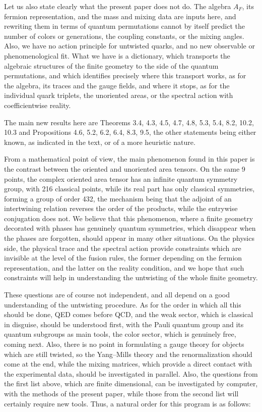 \documentclass[11pt]{amsart}
\theoremstyle{definition}
\begin{document}
Let us also state clearly what the present paper does not do. The algebra $A_F$, its fermion representation, and the mass and mixing data are inputs here, and rewriting them in terms of quantum permutations cannot by itself predict the number of colors or generations, the coupling constants, or the mixing angles. Also, we have no action principle for untwisted quarks, and no new observable or phenomenological fit. What we have is a dictionary, which transports the algebraic structures of the finite geometry to the side of the quantum permutations, and which identifies precisely where this transport works, as for the algebra, its traces and the gauge fields, and where it stops, as for the individual quark triplets, the unoriented areas, or the spectral action with coefficientwise reality.

The main new results here are Theorems 3.4, 4.3, 4.5, 4.7, 4.8, 5.3, 5.4, 8.2, 10.2, 10.3 and Propositions 4.6, 5.2, 6.2, 6.4, 8.3, 9.5, the other statements being either known, as indicated in the text, or of a more heuristic nature.

From a mathematical point of view, the main phenomenon found in this paper is the contrast between the oriented and unoriented area tensors. On the same 9 points, the complex oriented area tensor has an infinite quantum symmetry group, with 216 classical points, while its real part has only classical symmetries, forming a group of order 432, the mechanism being that the adjoint of an intertwining relation reverses the order of the products, while the entrywise conjugation does not. We believe that this phenomenon, where a finite geometry decorated with phases has genuinely quantum symmetries, which disappear when the phases are forgotten, should appear in many other situations. On the physics side, the physical trace and the spectral action provide constraints which are invisible at the level of the fusion rules, the former depending on the fermion representation, and the latter on the reality condition, and we hope that such constraints will help in understanding the untwisting of the whole finite geometry.

These questions are of course not independent, and all depend on a good understanding of the untwisting procedure. As for the order in which all this should be done, QED comes before QCD, and the weak sector, which is classical in disguise, should be understood first, with the Pauli quantum group \cite{bcp} and its quantum subgroups \cite{bbi} as main tools, the color sector, which is genuinely free, coming next. Also, there is no point in formulating a gauge theory for objects which are still twisted, so the Yang--Mills theory and the renormalization should come at the end, while the mixing matrices, which provide a direct contact with the experimental data, should be investigated in parallel. Also, the questions from the first list above, which are finite dimensional, can be investigated by computer, with the methods of the present paper, while those from the second list will certainly require new tools. Thus, a natural order for this program is as follows:
\end{document}
